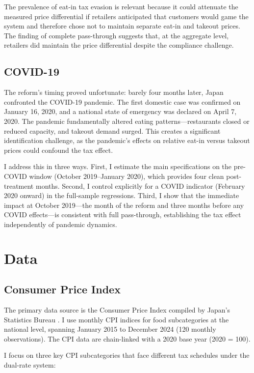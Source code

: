 \documentclass[12pt]{article}
\begin{document}
The prevalence of eat-in tax evasion is relevant because it could attenuate the measured price differential if retailers anticipated that customers would game the system and therefore chose not to maintain separate eat-in and takeout prices. The finding of complete pass-through suggests that, at the aggregate level, retailers did maintain the price differential despite the compliance challenge.

\subsection{COVID-19}

The reform's timing proved unfortunate: barely four months later, Japan confronted the COVID-19 pandemic. The first domestic case was confirmed on January 16, 2020, and a national state of emergency was declared on April 7, 2020. The pandemic fundamentally altered eating patterns---restaurants closed or reduced capacity, and takeout demand surged. This creates a significant identification challenge, as the pandemic's effects on relative eat-in versus takeout prices could confound the tax effect.

I address this in three ways. First, I estimate the main specifications on the pre-COVID window (October 2019--January 2020), which provides four clean post-treatment months. Second, I control explicitly for a COVID indicator (February 2020 onward) in the full-sample regressions. Third, I show that the immediate impact at October 2019---the month of the reform and three months before any COVID effects---is consistent with full pass-through, establishing the tax effect independently of pandemic dynamics.


\section{Data}
\label{sec:data}

\subsection{Consumer Price Index}

The primary data source is the Consumer Price Index compiled by Japan's Statistics Bureau \citep{jsb2024cpi}. I use monthly CPI indices for food subcategories at the national level, spanning January 2015 to December 2024 (120 monthly observations). The CPI data are chain-linked with a 2020 base year (2020 = 100).

I focus on three key CPI subcategories that face different tax schedules under the dual-rate system:
\end{document}
